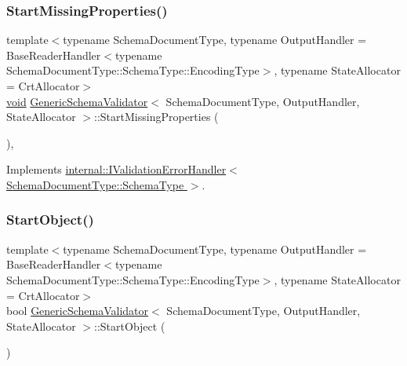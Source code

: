 \subsubsection{\texorpdfstring{Start\+Missing\+Properties()}{StartMissingProperties()}}
{\footnotesize\ttfamily template$<$typename Schema\+Document\+Type, typename Output\+Handler = Base\+Reader\+Handler$<$typename Schema\+Document\+Type\+::\+Schema\+Type\+::\+Encoding\+Type$>$, typename State\+Allocator = Crt\+Allocator$>$ \\
\hyperlink{imgui__impl__opengl3__loader_8h_ac668e7cffd9e2e9cfee428b9b2f34fa7}{void} \hyperlink{classGenericSchemaValidator}{Generic\+Schema\+Validator}$<$ Schema\+Document\+Type, Output\+Handler, State\+Allocator $>$\+::Start\+Missing\+Properties (\begin{DoxyParamCaption}{ }\end{DoxyParamCaption})\hspace{0.3cm}{\ttfamily [inline]}, {\ttfamily [virtual]}}



Implements \hyperlink{classinternal_1_1IValidationErrorHandler_ac0073bef86b572b4517876b304aada0f}{internal\+::\+I\+Validation\+Error\+Handler$<$ Schema\+Document\+Type\+::\+Schema\+Type $>$}.

\mbox{\label{classGenericSchemaValidator_a59972d612c3d37aae9a30222e428d216}} 
\subsubsection{\texorpdfstring{Start\+Object()}{StartObject()}}
{\footnotesize\ttfamily template$<$typename Schema\+Document\+Type, typename Output\+Handler = Base\+Reader\+Handler$<$typename Schema\+Document\+Type\+::\+Schema\+Type\+::\+Encoding\+Type$>$, typename State\+Allocator = Crt\+Allocator$>$ \\
bool \hyperlink{classGenericSchemaValidator}{Generic\+Schema\+Validator}$<$ Schema\+Document\+Type, Output\+Handler, State\+Allocator $>$\+::Start\+Object (\begin{DoxyParamCaption}{ }\end{DoxyParamCaption})\hspace{0.3cm}{\ttfamily [inline]}}

\mbox{\label{classGenericSchemaValidator_a33cf3f83307a8fea38c3238ef75c3d58}} 
